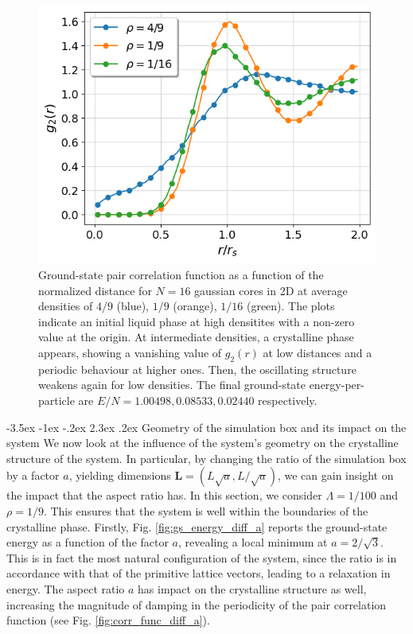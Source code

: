 \documentclass[a4paper, 12pt, oneside]{article}
\makeatletter
\renewcommand{\subsection}{\@startsection{subsection}{1}{\z@}%
             {-3.5ex \@plus-1ex \@minus-.2ex}%
             {2.3ex \@plus.2ex}%
             {\normalfont\normalsize\bfseries}}
\makeatother
\begin{document}
\begin{figure}[H]
    \centering
    \includegraphics[scale = 0.6]{figures/corr_func_diff_densities.png}
    \caption{\label{fig:corr_func_diff_densities}Ground-state pair correlation function as a function of the normalized distance
    for $N=16$ gaussian cores in 2D at average densities of $4/9$ (blue), $1/9$  (orange), $1/16$ (green). The plots indicate 
    an initial liquid phase at high densitites with a non-zero value at the origin. At intermediate densities,
    a crystalline phase appears, showing a vanishing value of $g_2(r)$ at low distances and a periodic behaviour at higher 
    ones. Then, the oscillating structure weakens again for low densities. The final ground-state 
    energy-per-particle are $E/N = 1.00498, 0.08533, 0.02440$ respectively.}
\end{figure}

\subsection{Geometry of the simulation box and its impact on the system}
We now look at the influence of the system's geometry on the crystalline structure of the system. 
In particular, by changing the ratio of the simulation box by a factor $a$, yielding dimensions 
$\bm{L} = (L\sqrt{a}, L/\sqrt{a})$, we can gain insight on the impact that the aspect ratio has.
In this section, we consider $\Lambda = 1/100$ and $\rho=1/9$. This ensures that the 
system is well within the boundaries of the crystalline phase. Firstly, Fig. \ref{fig:gs_energy_diff_a} reports the 
ground-state energy as a function of the factor $a$, revealing a local minimum at $a=2/\sqrt{3}$. This 
is in fact the most natural configuration of the system, since the ratio is in accordance with that of the 
primitive lattice vectors, leading to a relaxation in energy. The aspect ratio $a$ has impact on the 
crystalline structure as well, increasing the magnitude of damping in the periodicity of the pair correlation function (see 
Fig. \ref{fig:corr_func_diff_a}).
\end{document}
